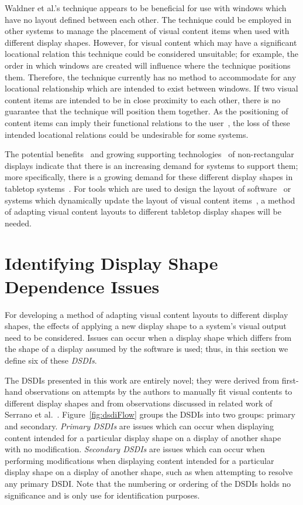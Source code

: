 \documentclass[twocolumn,compsoc]{cvm}
\begin{document}
Waldner et al.'s technique appears to be beneficial for use with windows which have no layout defined between each other.
The technique could be employed in other systems to manage the placement of visual content items when used with different display shapes.
However, for visual content which may have a significant locational relation this technique could be considered unsuitable; for example, the order in which windows are created will influence where the technique positions them.
Therefore, the technique currently has no method to accommodate for any locational relationship which are intended to exist between windows.
If two visual content items are intended to be in close proximity to each other, there is no guarantee that the technique will position them together.
As the positioning of content items can imply their functional relations to the user~\cite{Constantine1999}, the loss of these intended locational relations could be undesirable for some systems.

The potential benefits~\cite{Greenfield2006,Vernier2002} and growing supporting technologies~\cite{Boyd2007,Finney2009} of non-rectangular displays indicate that there is an increasing demand for systems to support them; more specifically, there is a growing demand for these different display shapes in tabletop systems~\cite{Hansen2009,Shen2004}.
For tools which are used to design the layout of software~\cite{Meskens2008} or systems which dynamically update the layout of visual content items~\cite{Gajos2004}, a method of adapting visual content layouts to different tabletop display shapes will be needed.

\section{Identifying Display Shape Dependence Issues}
\label{sec:problem}

For developing a method of adapting visual content layouts to different display shapes, the effects of applying a new display shape to a system's visual output need to be considered.
Issues can occur when a display shape which differs from the shape of a display assumed by the software is used; thus, in this section we define six of these {\emph{\acp{DSDI}}}.

The \acp{DSDI} presented in this work are entirely novel; they were derived from first-hand observations on attempts by the authors to manually fit visual contents to different display shapes and from observations discussed in related work of Serrano et al.~\cite{Serrano2016,Serrano2017}.
Figure~\ref{fig:dsdiFlow} groups the \acp{DSDI} into two groups: primary and secondary.
{\emph{Primary \acp{DSDI}}} are issues which can occur when displaying content intended for a particular display shape on a display of another shape with no modification.
{\emph{Secondary \acp{DSDI}}} are issues which can occur when performing modifications when displaying content intended for a particular display shape on a display of another shape, such as when attempting to resolve any primary \ac{DSDI}.
Note that the numbering or ordering of the \acp{DSDI} holds no significance and is only use for identification purposes.
\end{document}
